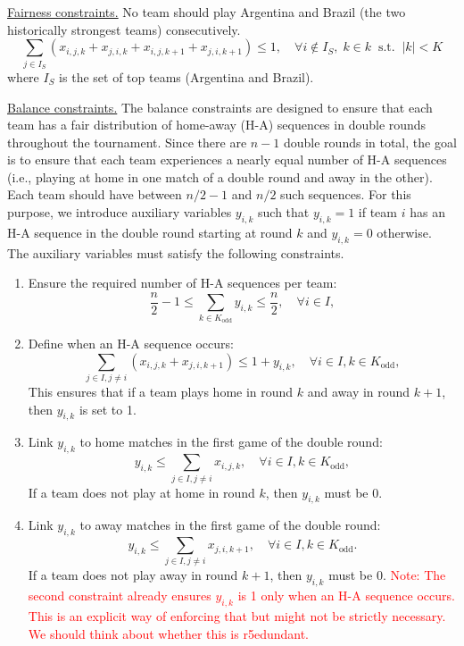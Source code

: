 \documentclass{article}
\begin{document}
\medskip
\noindent
\underline{Fairness constraints.}
No team should play Argentina and Brazil (the two historically strongest teams) consecutively.
\begin{equation}
    \sum_{j \in I_S} (x_{i,j,k} + x_{j,i,k} + x_{i,j,k+1} + x_{j,i,k+1}) \leq 1, \quad \forall i \notin I_S, \; k \in k \;\; \text{s.t.} \;\; |k| < K 
\end{equation}
where $I_S$ is the set of top teams (Argentina and Brazil).

\medskip
\noindent
\underline{Balance constraints.}
The balance constraints are designed to ensure that each team has a fair distribution of home-away (H-A) sequences in double rounds throughout the tournament. Since there are $n-1$ double rounds in total, the goal is to ensure that each team experiences a nearly equal number of H-A sequences (i.e., playing at home in one match of a double round and away in the other). Each team should have between $n/2-1$ and $n/2$ such sequences. For this purpose, we introduce auxiliary variables $y_{i,k}$ such that $y_{i,k}=1$ if team $i$ has an H-A sequence in the double round starting at round $k$ and $y_{i,k}=0$ otherwise. The auxiliary variables must satisfy the following constraints.
\begin{enumerate}
    \item Ensure the required number of H-A sequences per team:
    \begin{equation}
    \frac{n}{2} - 1 \leq \sum_{k \in K_{\text{odd}}} y_{i,k} \leq \frac{n}{2}, \quad \forall i \in I,
    \end{equation}
    \item Define when an H-A sequence occurs:
    \begin{equation}
    \sum_{j \in I, j \neq i} (x_{i,j,k} + x_{j,i,k+1}) \leq 1 + y_{i,k}, \quad \forall i \in I, k \in K_{\text{odd}},
    \end{equation}
    This ensures that if a team plays home in round $k$ and away in round $k+1$, then $y_{i,k}$ is set to 1.
    \item Link $y_{i,k}$ to home matches in the first game of the double round:
    \begin{equation}
    y_{i,k} \leq \sum_{j \in I, j \neq i} x_{i,j,k}, \quad \forall i \in I, k \in K_{\text{odd}},
    \end{equation}
    If a team does not play at home in round $k$, then $y_{i,k}$ must be 0.
    \item Link $y_{i,k}$ to away matches in the first game of the double round:
    \begin{equation}
    y_{i,k} \leq \sum_{j \in I, j \neq i} x_{j,i,k+1}, \quad \forall i \in I, k \in K_{\text{odd}}.
    \end{equation}
    If a team does not play away in round $k+1$, then $y_{i,k}$ must be 0.
    \textcolor{red}{Note: The second constraint already ensures $y_{i,k}$ is 1 only when an H-A sequence occurs. This is an explicit way of enforcing that but might not be strictly necessary. We should think about whether this is r5edundant.}
\end{enumerate}
\end{document}
